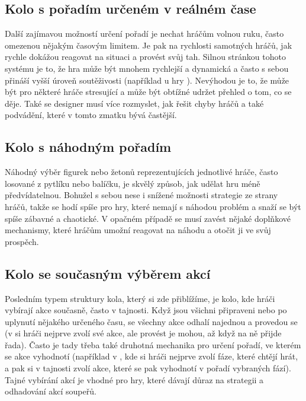 \subsection{Kolo s pořadím určeném v reálném čase}
\label{subsec:turns_realtime_order}

Další zajímavou možností určení pořadí je nechat hráčům volnou ruku, často omezenou nějakým časovým limitem. Je pak na rychlosti samotných hráčů, jak rychle dokážou reagovat na situaci a provést svůj tah. Silnou stránkou tohoto systému je to, že hra může být mnohem rychlejší a dynamická a často s sebou přináší vyšší úroveň soutěživosti (například u hry ). Nevýhodou je to, že může být pro některé hráče stresující a může být obtížné udržet přehled o tom, co se děje. Také se designer musí více rozmyslet, jak řešit chyby hráčů a také podvádění, které v tomto zmatku bývá častější.

\subsection{Kolo s náhodným pořadím}
\label{subsec:turns_random_order}

Náhodný výběr figurek nebo žetonů reprezentujících jednotlivé hráče, často losované z pytlíku nebo balíčku, je skvělý způsob, jak udělat hru méně předvídatelnou. Bohužel s sebou nese i snížené možnosti strategie ze strany hráčů, takže se hodí spíše pro hry, které nemají s náhodou problém a snaží se být spíše zábavné a chaotické. V opačném případě se musí zavést nějaké doplňkové mechanismy, které hráčům umožní reagovat na náhodu a otočit ji ve svůj prospěch.

\subsection{Kolo se současným výběrem akcí}
\label{subsec:turns_action_selection_order}

Posledním typem struktury kola, který si zde přiblížíme, je kolo, kde hráči vybírají akce současně, často v tajnosti. Když jsou všichni připraveni nebo po uplynutí nějakého určeného času, se všechny akce odhalí najednou a provedou se (v  si hráči nejprve zvolí své akce, ale provést je mohou, až když na ně přijde řada). Často je tady třeba také druhotná mechanika pro určení pořadí, ve kterém se akce vyhodnotí (například v , kde si hráči nejprve zvolí fáze, které chtějí hrát, a pak si v tajnosti zvolí akce, které se pak vyhodnotí v pořadí vybraných fází). Tajné vybírání akcí je vhodné pro hry, které dávají důraz na strategii a odhadování akcí soupeřů.


